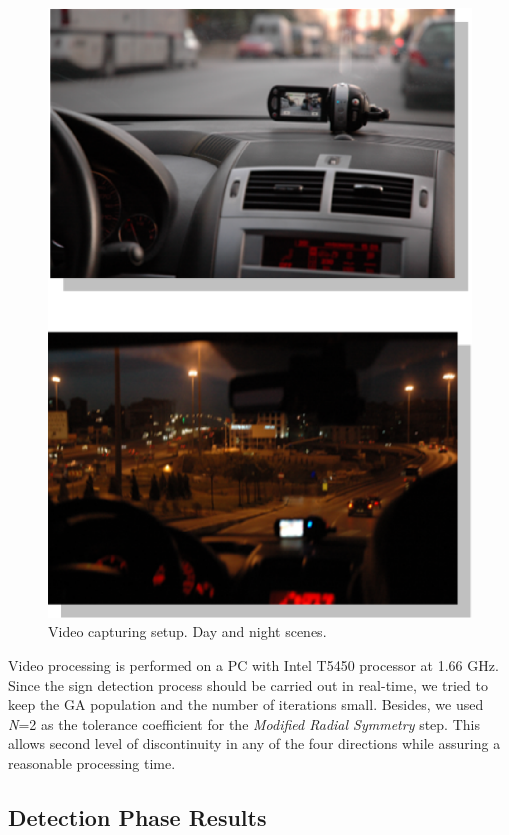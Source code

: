 \documentclass[review,number]{elsarticle}
\begin{document}
\begin{figure}[ht]
\begin{center}
\includegraphics[scale=0.4]{img/signfig30.eps}
\caption{Video capturing setup. Day and night scenes.}
\label{signfig30}
\end{center}
\end{figure}

Video processing is performed on a PC with Intel T5450 processor at 1.66 GHz. Since the sign detection process should be carried out in real-time, we tried to keep the GA population and the number of iterations small. Besides, we used \textit{N}=2 as the tolerance coefficient for the \textit{Modified Radial Symmetry} step. This allows second level of discontinuity in any of the four directions while assuring a reasonable processing time.

\subsection{Detection Phase Results}
\end{document}
